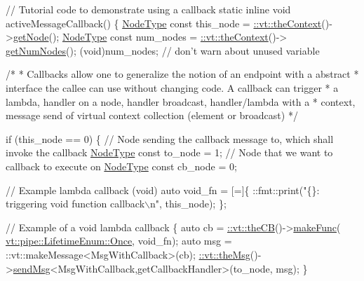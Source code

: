 \begin{DoxyCodeInclude}
\textcolor{comment}{// Tutorial code to demonstrate using a callback}
\textcolor{keyword}{static} \textcolor{keyword}{inline} \textcolor{keywordtype}{void} activeMessageCallback() \{
  \hyperlink{namespacevt_a866da9d0efc19c0a1ce79e9e492f47e2}{NodeType} \textcolor{keyword}{const} this\_node = \hyperlink{namespacevt_a26551fe0e6e6a1371111df5b12c7e92c}{::vt::theContext}()->\hyperlink{structvt_1_1ctx_1_1_context_a0d52c263ce8516546a67443d9a86fa5f}{getNode}();
  \hyperlink{namespacevt_a866da9d0efc19c0a1ce79e9e492f47e2}{NodeType} \textcolor{keyword}{const} num\_nodes = \hyperlink{namespacevt_a26551fe0e6e6a1371111df5b12c7e92c}{::vt::theContext}()->
      \hyperlink{structvt_1_1ctx_1_1_context_a7f41071aadf6d5fa9e1b6c703c5ff19d}{getNumNodes}();
  (void)num\_nodes;  \textcolor{comment}{// don't warn about unused variable}

  \textcolor{comment}{/*}
\textcolor{comment}{   * Callbacks allow one to generalize the notion of an endpoint with a abstract}
\textcolor{comment}{   * interface the callee can use without changing code. A callback can trigger}
\textcolor{comment}{   * a lambda, handler on a node, handler broadcast, handler/lambda with a}
\textcolor{comment}{   * context, message send of virtual context collection (element or broadcast)}
\textcolor{comment}{   */}

  \textcolor{keywordflow}{if} (this\_node == 0) \{
    \textcolor{comment}{// Node sending the callback message to, which shall invoke the callback}
    \hyperlink{namespacevt_a866da9d0efc19c0a1ce79e9e492f47e2}{NodeType} \textcolor{keyword}{const} to\_node = 1;
    \textcolor{comment}{// Node that we want to callback to execute on}
    \hyperlink{namespacevt_a866da9d0efc19c0a1ce79e9e492f47e2}{NodeType} \textcolor{keyword}{const} cb\_node = 0;

    \textcolor{comment}{// Example lambda callback (void)}
    \textcolor{keyword}{auto} void\_fn = [=]\{
      ::fmt::print(\textcolor{stringliteral}{"\{\}: triggering void function callback\(\backslash\)n"}, this\_node);
    \};

    \textcolor{comment}{// Example of a void lambda callback}
    \{
      \textcolor{keyword}{auto} cb = \hyperlink{namespacevt_a673b109e94c7bca58313504c83e1da94}{::vt::theCB}()->\hyperlink{structvt_1_1pipe_1_1_pipe_manager_a9ceec59c887d0fa1498b931c788962f6}{makeFunc}(
      \hyperlink{namespacevt_1_1pipe_acb42b284378c0fdac1d7c6335dc26f58ae1a9dc9f23534e63de9df0d540ac1611}{vt::pipe::LifetimeEnum::Once}, void\_fn);
      \textcolor{keyword}{auto} msg = ::vt::makeMessage<MsgWithCallback>(cb);
      \hyperlink{namespacevt_aeafd31f866aeb4dc6fc2f6ee97136350}{::vt::theMsg}()->\hyperlink{group__preregister_ga0162a39473e7f9b490a79a7983d949ac}{sendMsg}<MsgWithCallback,getCallbackHandler>(to\_node, msg);
    \}


\end{DoxyCodeInclude}
